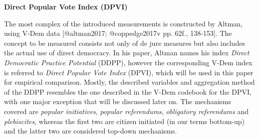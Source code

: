 \documentclass[]{article}
\begin{document}
\textbf{Direct Popular Vote Index (DPVI)}

The most complex of the introduced measurements is constructed by
Altman, using V-Dem data {[}@altman2017; @coppedge2017v pp. 62f.,
138-153{]}. The concept to be measured consists not only of de jure
measures but also includes the actual use of direct democracy. In his
paper, Altman names his index \emph{Direct Democratic Practice
Potential} (DDPP), however the corresponding V-Dem index is referred to
\emph{Direct Popular Vote Index} (DPVI), which will be used in this
paper for empirical comparison. Mostly, the described variables and
aggregation method of the DDPP resembles the one described in the V-Dem
codebook for the DPVI, with one major exception that will be discussed
later on. The mechanisms covered are \emph{popular initiatives},
\emph{popular referendums}, \emph{obligatory referendums} and
\emph{plebiscites}, whereas the first two are citizen initiated (in our
terms bottom-up) and the latter two are considered top-down mechanisms.
\end{document}
